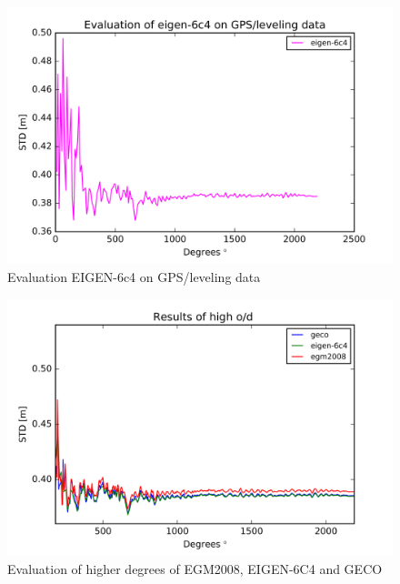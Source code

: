         \begin{figure}[t]
        	\caption{Evaluation EIGEN-6c4 on GPS/leveling data}
        	\label{sudan_data}
        	\includegraphics{Figures/eigen-6c4_gps_figure.png}
        	\centering
        \end{figure}
        
        \begin{figure}[t]
              	\caption{Evaluation of higher degrees of EGM2008, EIGEN-6C4 and GECO}
              	\label{sudan_data}
              	\includegraphics{Figures/high_order_results.png}
              	\centering
        \end{figure}